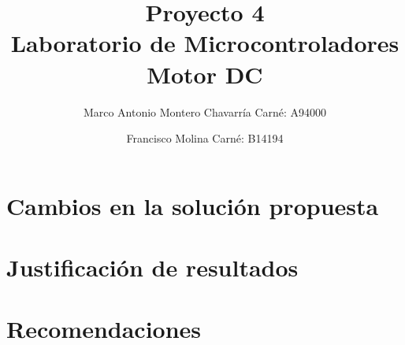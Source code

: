 \documentclass[letterpaper]{article}
\begin{document}
\title{Proyecto 4\\ Laboratorio de Microcontroladores Motor DC}
\author{
 Marco Antonio Montero Chavarría Carné: A94000\\
  \and
  Francisco Molina Carné: B14194\\  
}
\maketitle

\section{Cambios en la solución propuesta}

\newpage



\newpage
\section{Justificación de resultados}

\newpage
\section{Recomendaciones}

\begin{itemize}

\end{itemize}

 

\end{document}
